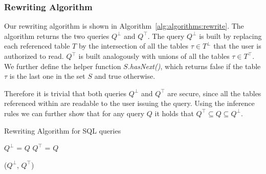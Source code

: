 \subsubsection{Rewriting Algorithm}
%
Our rewriting algorithm is shown in Algorithm~\ref{alg:algorithms:rewrite}. %
%
The algorithm returns the two queries $Q^\bot$ and $Q^\top$.
%
The query $Q^\bot$ is built by replacing each referenced table $T$ by the intersection of all the tables $\tau \in T^\bot$ that the user is authorized to read.
%
$Q^\top$ is built analogously with unions of all the tables $\tau \in T^\top$.
%
We further define the helper function \emph{$S$.hasNext()}, which returns false if the table $\tau$ is the last one in the set $S$ and true otherwise. 



%
Therefore it is trivial that both queries $Q^\bot$ and $Q^\top$ are secure, since all the tables referenced within are readable to the user issuing the query.
%
Using the inference rules we can further show that for any query $Q$ it holds that $Q^\top \subseteq Q \subseteq Q^\bot$.
%

%
\begin{algorithm}
\caption{Rewriting Algorithm for SQL queries}
\label{alg:algorithms:rewrite}
	\SetAlgoLined
	$Q^\bot$ = $Q$\;
	$Q^\top$ = $Q$\;

     \Return ($Q^\bot$, $Q^\top$)\;
\end{algorithm}

